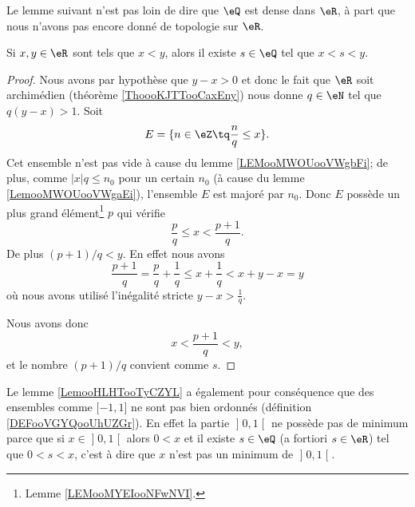 Le lemme suivant n'est pas loin de dire que \( \eQ\) est dense dans \( \eR\), à part que nous n'avons pas encore donné de topologie sur \( \eR\).
\begin{lemma}       \label{LemooHLHTooTyCZYL}
    Si \( x,y\in \eR\) sont tels que \( x<y\), alors il existe \( s\in \eQ\) tel que \( x<s<y\).
\end{lemma}

\begin{proof}
    Nous avons par hypothèse que \( y-x>0\) et donc le fait que \( \eR\) soit archimédien (théorème \ref{ThoooKJTTooCaxEny}) nous donne \( q\in \eN\) tel que \( q(y-x)>1\). Soit
    \begin{equation}
        E=\{ n\in \eZ\tq \frac{ n }{ q }\leq x \}.
    \end{equation}
    Cet ensemble n'est pas vide à cause du lemme \ref{LEMooMWOUooVWgbFi}; de plus, comme \( |x|q \leq n_0\) pour un certain \( n_0 \) (à cause du lemme \ref{LemooMWOUooVWgaEi}), l'ensemble \( E\) est majoré par \( n_0\). Donc \( E\) possède un plus grand élément\footnote{Lemme \ref{LEMooMYEIooNFwNVI}.} \( p\) qui vérifie
    \begin{equation}
        \frac{ p }{ q }\leq x<\frac{ p+1 }{ q }.
    \end{equation}
    De plus \( (p+1)/q<y\). En effet nous avons
    \begin{equation}
        \frac{ p+1 }{ q }=\frac{ p }{ q }+\frac{1}{ q }\leq x+\frac{1}{ q }<x+y-x=y
    \end{equation}
    où nous avons utilisé l'inégalité stricte \( y-x>\frac{1}{ q }\).

    Nous avons donc
    \begin{equation}
        x<\frac{ p+1 }{ q }<y,
    \end{equation}
    et le nombre \( (p+1)/q\) convient comme \( s\).
\end{proof}

\begin{remark}      \label{REMooXOIOooHjwMvA}
    Le lemme \ref{LemooHLHTooTyCZYL} a également pour conséquence que des ensembles comme \( \mathopen[ -1 , 1 \mathclose]\) ne sont pas bien ordonnés (définition \ref{DEFooVGYQooUhUZGr}). En effet la partie \( \mathopen] 0 , 1 \mathclose[\) ne possède pas de minimum parce que si \( x\in \mathopen] 0 , 1 \mathclose[\) alors \( 0<x\) et il existe \( s\in \eQ\) (a fortiori \( s\in \eR\)) tel que \( 0<s<x\), c'est à dire que \( x\) n'est pas un minimum de \( \mathopen] 0 , 1 \mathclose[\).
\end{remark}

